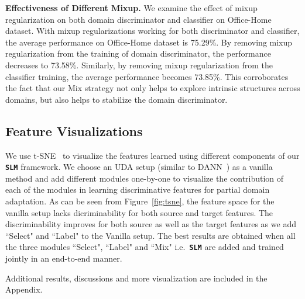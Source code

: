 \documentclass[10pt,twocolumn,letterpaper]{article}
\def\ours{\texttt{\textbf{SLM}}\xspace}
\begin{document}
\vspace{1mm}
\noindent\textbf{Effectiveness of Different Mixup.} We examine the effect of mixup regularization on both domain discriminator and classifier on Office-Home dataset. With mixup regularizations working for both discriminator and classifier, the average performance on Office-Home dataset is 75.29\%. By removing mixup regularization from the training of domain discriminator, the performance decreases to 73.58\%. Similarly, by removing mixup regularization from the classifier training, the average performance becomes 73.85\%. This corroborates the fact that our Mix strategy not only helps to explore intrinsic structures across domains, but also helps to stabilize the domain discriminator.  

\subsection{Feature Visualizations}

We use t-SNE~\cite{maaten2008visualizing} to visualize the features learned using different components of our \ours framework. We choose an UDA setup (similar to DANN~\cite{ganin2016domain}) as a vanilla method and add different modules one-by-one to visualize the contribution of each of the modules in learning discriminative features for partial domain adaptation. As can be seen from Figure~\ref{fig:tsne}, the feature space for the vanilla setup lacks dicriminability for both source and target features. The discriminability improves for both source as well as the target features as we add ``Select" and ``Label" to the Vanilla setup. The best results are obtained when all the three modules ``Select", ``Label" and ``Mix" i.e.~\ours are added and trained jointly in an end-to-end manner. 
  
Additional results, discussions and more visualization are included in the Appendix.
\end{document}
